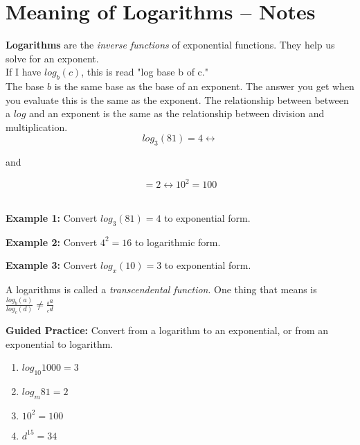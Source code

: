 \documentclass[12pt]{article}
\begin{document}
\pagebreak

\section{Meaning of Logarithms -- Notes}

\textbf{Logarithms} are the \textit{inverse functions} of exponential functions. They help us solve for an exponent.\\

If I have $log_{b}(c)$, this is read "log base b of c."\\

The base $b$ is the same base as the base of an exponent. The answer you get when you evaluate this is the same as the exponent. The relationship between between a $log$ and an exponent is the same as the relationship between division and multiplication.\\

$$log_{3}(81)=4 \longleftrightarrow $$

and

$$=2 \longleftrightarrow 10^2=100$$\\

\hrulefill

\textbf{Example 1:} Convert $log_{3}(81)=4$ to exponential form.\\

\vspace{1cm}

\textbf{Example 2:} Convert $4^2=16$ to logarithmic form.\\

\vspace{1cm}

\textbf{Example 3:} Convert $log_{x}(10)=3$ to exponential form.\\

\vspace{1cm}

A logarithms is called a \textit{transcendental function}. One thing that means is $\frac{log_{b}(a)}{log_{c}(d)} \neq \frac{_ba}{_cd}$\\

\hrulefill

\textbf{Guided Practice:} Convert from a logarithm to an exponential, or from an exponential to logarithm.\\

\begin{multicols}{2}
\begin{enumerate}
	\setlength\itemsep{1cm}
	
	\item $log_{10}1000=3$\\
	
	\item $log_m{81}=2$\\
	
	\item $10^{2}=100$\\
	
	\item $d^{15}=34$\\

\end{enumerate}
\end{multicols}
\end{document}
